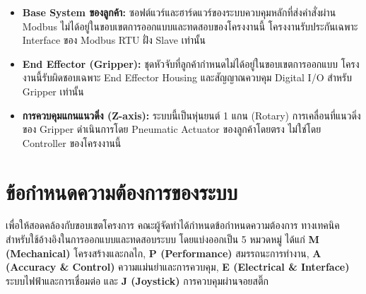 \begin{itemize}
  \item \textbf{Base System ของลูกค้า:}
        ซอฟต์แวร์และฮาร์ดแวร์ของระบบควบคุมหลักที่ส่งคำสั่งผ่าน Modbus
        ไม่ได้อยู่ในขอบเขตการออกแบบและทดสอบของโครงงานนี้
        โครงงานรับประกันเฉพาะ Interface ของ Modbus RTU ฝั่ง Slave เท่านั้น

  \item \textbf{End Effector (Gripper):}
        ชุดหัวจับที่ลูกค้ากำหนดไม่ได้อยู่ในขอบเขตการออกแบบ
        โครงงานนี้รับผิดชอบเฉพาะ End Effector Housing
        และสัญญาณควบคุม Digital I/O สำหรับ Gripper เท่านั้น

  \item \textbf{การควบคุมแกนแนวดิ่ง (Z-axis):}
        ระบบนี้เป็นหุ่นยนต์ 1 แกน (Rotary)
        การเคลื่อนที่แนวดิ่งของ Gripper ดำเนินการโดย Pneumatic Actuator
        ของลูกค้าโดยตรง ไม่ใช่โดย Controller ของโครงงานนี้
\end{itemize}

\section{ข้อกำหนดความต้องการของระบบ}
\label{sec:requirements}

เพื่อให้สอดคล้องกับขอบเขตโครงการ คณะผู้จัดทำได้กำหนดข้อกำหนดความต้องการ
ทางเทคนิคสำหรับใช้อ้างอิงในการออกแบบและทดสอบระบบ โดยแบ่งออกเป็น 5 หมวดหมู่ ได้แก่
\textbf{M (Mechanical)} โครงสร้างและกลไก,
\textbf{P (Performance)} สมรรถนะการทำงาน,
\textbf{A (Accuracy \& Control)} ความแม่นยำและการควบคุม,
\textbf{E (Electrical \& Interface)} ระบบไฟฟ้าและการเชื่อมต่อ
และ \textbf{J (Joystick)} การควบคุมผ่านจอยสติ๊ก

